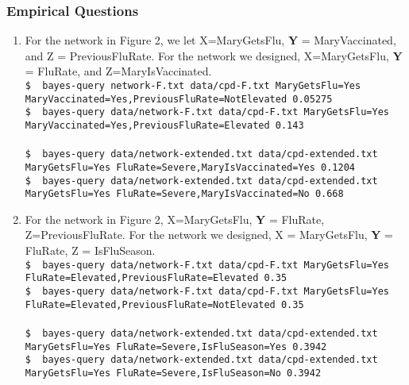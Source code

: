 \documentclass[12pt]{article}
\begin{document}
\subsubsection{Empirical Questions}

\begin{enumerate}
	\item For the network in Figure 2, we let X=MaryGetsFlu, \textbf{Y} = MaryVaccinated, and
    Z = PreviousFluRate. For the network we designed, X=MaryGetsFlu, \textbf{Y} = FluRate,
    and Z=MaryIsVaccinated.\\

    \texttt{\$~~bayes-query network-F.txt data/cpd-F.txt MaryGetsFlu=Yes MaryVaccinated=Yes,PreviousFluRate=NotElevated
    0.05275}\\
    \texttt{\$~~bayes-query data/network-F.txt data/cpd-F.txt MaryGetsFlu=Yes MaryVaccinated=Yes,PreviousFluRate=Elevated
    0.143}\\\\

    \texttt{\$~~bayes-query data/network-extended.txt data/cpd-extended.txt MaryGetsFlu=Yes FluRate=Severe,MaryIsVaccinated=Yes
    0.1204}\\
    \texttt{\$~~bayes-query data/network-extended.txt data/cpd-extended.txt MaryGetsFlu=Yes FluRate=Severe,MaryIsVaccinated=No
    0.668}\\

	\item For the network in Figure 2, X=MaryGetsFlu, \textbf{Y} = FluRate, Z=PreviousFluRate.
    For the network we designed, X = MaryGetsFlu, \textbf{Y} = FluRate, Z = IsFluSeason.\\

    \texttt{\$~~bayes-query data/network-F.txt data/cpd-F.txt MaryGetsFlu=Yes FluRate=Elevated,PreviousFluRate=Elevated 
    0.35}\\
    \texttt{\$~~bayes-query data/network-F.txt data/cpd-F.txt MaryGetsFlu=Yes FluRate=Elevated,PreviousFluRate=NotElevated
    0.35}\\\\
    \texttt{\$~~bayes-query data/network-extended.txt data/cpd-extended.txt MaryGetsFlu=Yes FluRate=Severe,IsFluSeason=Yes
    0.3942}\\
    \texttt{\$~~bayes-query data/network-extended.txt data/cpd-extended.txt MaryGetsFlu=Yes FluRate=Severe,IsFluSeason=No
    0.3942}\\


\end{enumerate}
\end{document}
